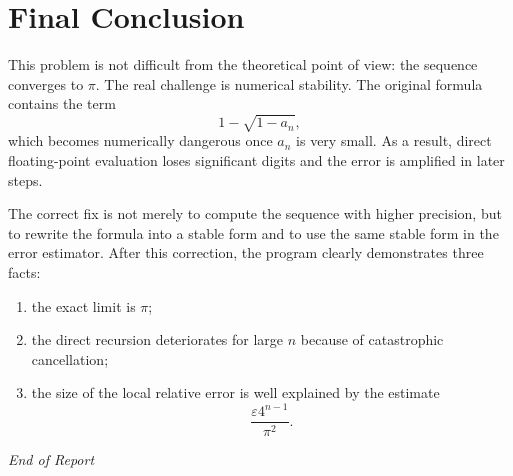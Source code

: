 \documentclass[12pt,a4paper]{article}
\begin{document}
\section{Final Conclusion}

This problem is not difficult from the theoretical point of view: the sequence converges to $\pi$. The real challenge is numerical stability. The original formula contains the term
\[
1 - \sqrt{1-a_n},
\]
which becomes numerically dangerous once $a_n$ is very small. As a result, direct floating-point evaluation loses significant digits and the error is amplified in later steps.

The correct fix is not merely to compute the sequence with higher precision, but to rewrite the formula into a stable form and to use the same stable form in the error estimator. After this correction, the program clearly demonstrates three facts:
\begin{enumerate}[label=(\arabic*)]
    \item the exact limit is $\pi$;
    \item the direct recursion deteriorates for large $n$ because of catastrophic cancellation;
    \item the size of the local relative error is well explained by the estimate
    \[
    \frac{\varepsilon 4^{n-1}}{\pi^2}.
    \]
\end{enumerate}

\vfill
\begin{center}
    \textit{End of Report}
\end{center}
\end{document}
